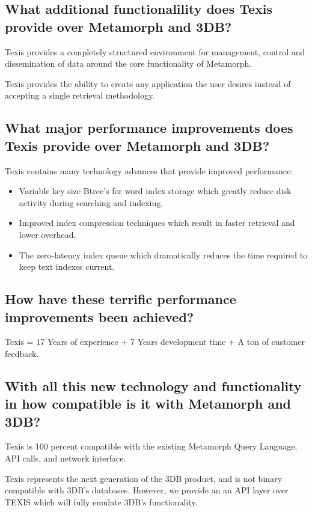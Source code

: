 \subsection{What additional functionalility does Texis provide over Metamorph and 3DB?}

Texis provides a completely structured environment for management, control
and dissemination of data around the core functionality of Metamorph.

Texis provides the ability to create any application the user
desires instead of accepting a single retrieval methodology.

\subsection{What major performance improvements does Texis provide over Metamorph and 3DB?}

Texis contains many technology advances that provide improved performance:
\begin{itemize}
\item Variable key size Btree's for word index storage which greatly
reduce disk activity during searching and indexing.

\item Improved index compression techniques which result in faster
retrieval and lower overhead.

\item The zero-latency index queue which dramatically reduces the
time required to keep text indexes current.
\end{itemize}

\subsection{How have these terrific performance improvements been achieved?}

Texis = 17 Years of experience + 7 Years development time + A ton of
customer feedback.


\subsection{With all this new technology and functionality in how
compatible is it with Metamorph and 3DB?}

Texis is 100 percent compatible with the existing Metamorph Query
Language, API calls, and network interface.

Texis represents the next generation of the 3DB product, and is not binary
compatible with 3DB's databases.  However, we provide an an API layer over
TEXIS which will fully emulate 3DB's functionality.

